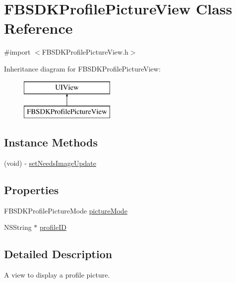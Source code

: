 \hypertarget{interface_f_b_s_d_k_profile_picture_view}{}\section{F\+B\+S\+D\+K\+Profile\+Picture\+View Class Reference}
\label{interface_f_b_s_d_k_profile_picture_view}


{\ttfamily \#import $<$F\+B\+S\+D\+K\+Profile\+Picture\+View.\+h$>$}

Inheritance diagram for F\+B\+S\+D\+K\+Profile\+Picture\+View\+:\begin{figure}[H]
\begin{center}
\leavevmode
\includegraphics[height=2.000000cm]{interface_f_b_s_d_k_profile_picture_view}
\end{center}
\end{figure}
\subsection*{Instance Methods}
\begin{DoxyCompactItemize}
\item 
(void) -\/ \hyperlink{interface_f_b_s_d_k_profile_picture_view_a85cf6e982649d5e54b7ba1d7a4863b9b}{set\+Needs\+Image\+Update}
\end{DoxyCompactItemize}
\subsection*{Properties}
\begin{DoxyCompactItemize}
\item 
F\+B\+S\+D\+K\+Profile\+Picture\+Mode \hyperlink{interface_f_b_s_d_k_profile_picture_view_a81338c394b7aaf54cd76824f6530e4ea}{picture\+Mode}
\item 
N\+S\+String $\ast$ \hyperlink{interface_f_b_s_d_k_profile_picture_view_a1b4fb53fb08bb34d83f83d28d3733571}{profile\+I\+D}
\end{DoxyCompactItemize}


\subsection{Detailed Description}
A view to display a profile picture. 

